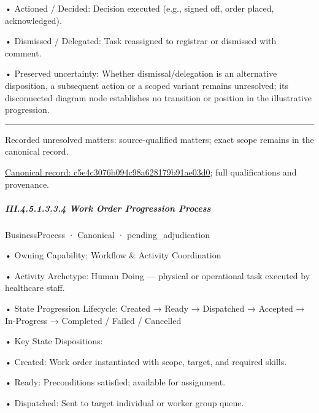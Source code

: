 •
Actioned / Decided: Decision executed (e.g., signed off, order placed, acknowledged).



•
Dismissed / Delegated: Task reassigned to registrar or dismissed with comment.



•
Preserved uncertainty: Whether dismissal/delegation is an alternative disposition, a subsequent action or a scoped variant remains unresolved; its disconnected diagram node establishes no transition or position in the illustrative progression.



\medskip\hrule\medskip

{\small Recorded unresolved matters: source-qualified matters; exact scope remains in the canonical record.}\par
{\footnotesize \href{../../../../../../../continuum/business/business-process/c5e4c3076b094c98a628179b91ae03d0.md}{Canonical record: c5e4c3076b094c98a628179b91ae03d0}; full qualifications and provenance.}\par
\subparagraph*{III.4.5.1.3.3.4 Work Order Progression Process}
\label{navigation:III.4.5.1.3.3.4}

\label{element:73fbbe4e027b4805809fad430e791eba}
{\small BusinessProcess · Canonical · pending\_adjudication}\par

•
Owning Capability: Workflow \& Activity Coordination



•
Activity Archetype: Human Doing — physical or operational task executed by healthcare staff.



•
State Progression Lifecycle: Created → Ready → Dispatched → Accepted → In-Progress → Completed / Failed / Cancelled



•
Key State Dispositions:



•
Created: Work order instantiated with scope, target, and required skills.



•
Ready: Preconditions satisfied; available for assignment.



•
Dispatched: Sent to target individual or worker group queue.



